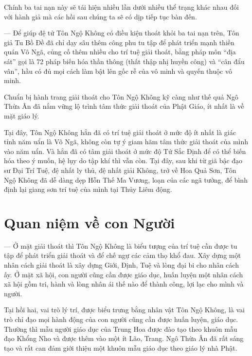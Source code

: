 Chính ba tai nạn này sẽ tái hiện nhiều lần dưới nhiều thể trạng khác nhau đối với hành giả mà các hồi sau chúng ta sẽ có dịp tiếp tục bàn đến.

— Để giúp đệ tử Tôn Ngộ Không có điều kiện thoát khỏi ba tai nạn trên, Tôn giả Tu Bồ Đề đã chỉ dạy sâu thêm công phu tu tập để phát triển mạnh thiền quán Vô Ngã, củng cố thêm nhiều cho trí tuệ giải thoát, bằng pháp môn ``địa sát'' gọi là 72 pháp biến hóa thần thông (thất thập nhị huyền công) và ``cân đẩu vân'', hầu có đủ mọi cách làm bật lên gốc rễ của vô minh và quyến thuộc vô minh.

Chuẩn bị hành trang giải thoát cho Tôn Ngộ Không kỹ càng như thế quả Ngô Thừa Ân đã nắm vững lộ trình tâm thức giải thoát của Phật Giáo, ít nhất là về mặt giáo lý.

Tại đây, Tôn Ngộ Không hẳn đã có trí tuệ giải thoát ở mức độ ít nhất là giác tỉnh năm uẩn là Vô Ngã, không còn tự ý giam hãm tâm thức giải thoát của mình vào năm uẩn. Và hẳn đã có tâm giải thoát ở mức độ Tứ Sắc Định để có thể biến hóa theo ý muốn, hệ lụy do tập khí thì vẫn còn. Tại đây, sau khi từ giã bậc đạo sư Đại Trí Tuệ, đệ nhất ly thủ, đệ nhất giải Không, trở về Hoa Quả Sơn, Tôn Ngộ Không đã dễ dàng dẹp Hỗn Thế Ma Vương, loạn của các ngã tưởng, để bình định lại giang sơn trí tuệ của mình tại Thủy Liêm động.

\section{Quan niệm về con Người} %
\label{sec:2_quan_niem_ve_con_nguoi}

— Ở mặt giải thoát thì Tôn Ngộ Không là biểu tượng của trí tuệ cần được tu tập để phát triển giải thoát và để chế ngự các cảm thọ khổ đau. Xây dựng một nhân cách giải thoát là xây dựng Giới, Định, Tuệ và lòng đại bi cho nhân cách ấy. Ở mặt xã hội, con người cũng cần được giáo dục, huấn luyện một nhân cách xã hội gồm tri, hành và lòng nhân ái thế nào để thành công, lợi lạc cho mình và người.

Tại hồi hai, vai trò lý trí, được biểu trưng bằng nhân vật Tôn Ngộ Không, là vai trò chỉ đạo mọi hành động của con người cũng cần được huấn luyện, giáo dục. Thường thì mẫu người giáo dục của Trung Hoa được đào tạo theo khuôn mẫu đạo Khổng Nho và được thêm vào một ít Lão, Trang. Ngô Thừa Ân đã rất sáng tạo và rất can đảm giới thiệu một khuôn mẫu giáo dục theo giáo lý nhà Phật.

